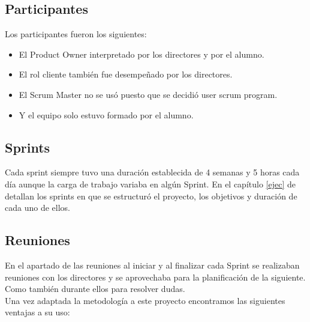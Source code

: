 \subsection{Participantes}
Los participantes fueron los siguientes:
\begin{itemize}
\item El Product Owner interpretado por los  directores y por el alumno.
\item El rol  cliente también fue desempeñado por los directores.
\item El Scrum Master no se usó puesto que se decidió 
 user scrum program.
\item  Y el equipo solo estuvo formado por el alumno.

\end{itemize}

\subsection{Sprints}
Cada sprint siempre tuvo una duración establecida de 4 semanas y 5 horas cada día aunque la carga de trabajo variaba en algún Sprint.
En el capítulo \ref{ejec} de detallan los sprints en que se estructuró el proyecto, los objetivos y duración de cada uno de ellos.

\subsection{Reuniones}

En el apartado de las reuniones al iniciar y al finalizar cada Sprint se realizaban reuniones con los directores y se aprovechaba para la planificación de la siguiente. Como también durante ellos para resolver dudas.\\

Una vez adaptada la metodología a este proyecto encontramos las siguientes ventajas a su uso:

